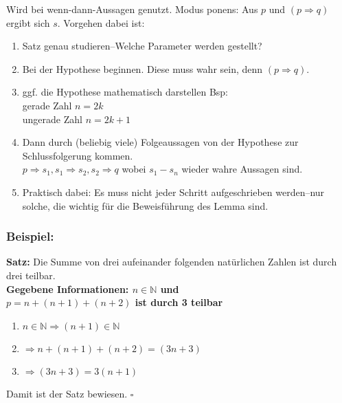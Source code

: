 \begin{framed} 
  Wird bei wenn-dann-Aussagen genutzt. Modus ponens: Aus $p$ und 
  $(p \Rightarrow q)$ ergibt sich $s$. Vorgehen dabei ist:
  \begin{enumerate}
    \item Satz genau studieren--Welche Parameter werden gestellt?
    \item Bei der Hypothese beginnen. Diese muss wahr sein, denn 
          $(p \Rightarrow q)$.
    \item ggf. die Hypothese mathematisch darstellen Bsp:\\
          gerade Zahl $n = 2k$\\
          ungerade Zahl $n = 2k + 1$
    \item Dann durch (beliebig viele) Folgeaussagen von der Hypothese zur 
          Schlussfolgerung kommen.\\
          $p \Rightarrow s_1, s_1 \Rightarrow s_2, s_2 \Rightarrow q$ wobei 
          $s_1 - s_n$ wieder wahre Aussagen sind.
    \item Praktisch dabei: Es muss nicht jeder Schritt aufgeschrieben werden--nur
          solche, die wichtig für die Beweisführung des Lemma sind.
  \end{enumerate}

  \subsubsection*{Beispiel:}
  \textbf{Satz:} \dq{}Die Summe von drei aufeinander folgenden natürlichen Zahlen 
                ist durch drei teilbar.\dq{}\\
  \textbf{Gegebene Informationen: $n \in \mathbb{N}$ und\\
  $p = n + (n+1) + (n+2)$ ist durch 3 teilbar}
  \begin{enumerate}
    \item $n \in \mathbb{N} \Rightarrow (n+1) \in \mathbb{N}$
    \item $\Rightarrow n + (n+1) + (n+2) = (3n + 3)$
    \item $\Rightarrow (3n + 3) = 3(n + 1)$
  \end{enumerate}
  Damit ist der Satz bewiesen. $\square$
\end{framed}


